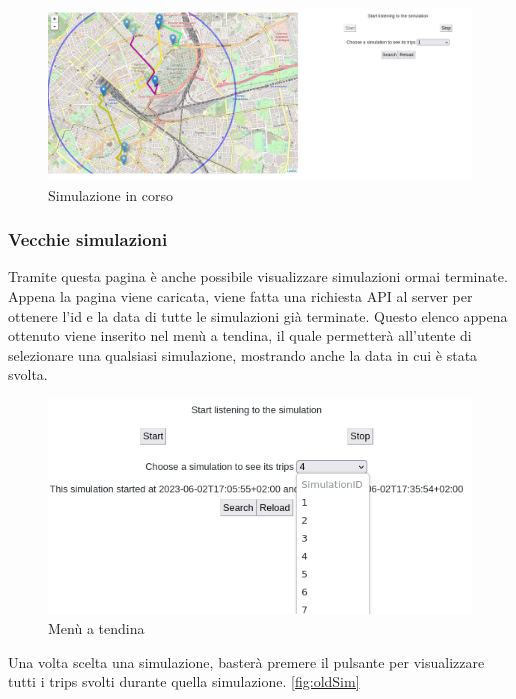 \documentclass[main.tex]{subfiles}
\begin{document}
\begin{figure}[H]
    \centering
    \includegraphics[width=1\linewidth]     {img/simulazione/web/runningTrip.png}
    \caption{Simulazione in corso}
     \label{fig:runningTrip}
\end{figure}

\subsubsection{Vecchie simulazioni}
Tramite questa pagina è anche possibile visualizzare simulazioni ormai terminate. \newline
Appena la pagina viene caricata, viene fatta una richiesta API al server per ottenere l'id e la data di tutte le simulazioni già terminate. Questo elenco appena ottenuto viene inserito nel menù a tendina, il quale permetterà all'utente di selezionare una qualsiasi simulazione, mostrando anche la data in cui è stata svolta. 

\begin{figure}[H]
    \centering
    \includegraphics[width=1\linewidth]     {img/simulazione/web/simulationSelect.png}
    \caption{Menù a tendina}
     \label{fig:simulationSelect}
\end{figure}

Una volta scelta una simulazione, basterà premere il pulsante  per visualizzare tutti i trips svolti durante quella simulazione. \ref{fig:oldSim}
\end{document}
